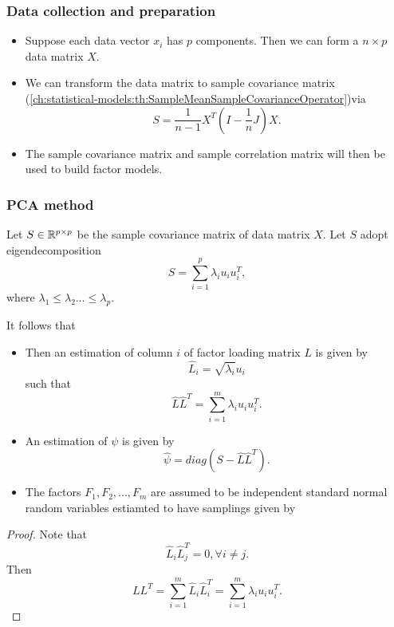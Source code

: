 \begin{refsection}
\subsubsection{Data collection and preparation}

\begin{remark}\hfill
\begin{itemize}
	\item Suppose each data vector $x_i$ has $p$ components. Then we can form a $n\times p$ data matrix $X$.
	\item We can transform the data matrix to sample covariance matrix (\autoref{ch:statistical-models:th:SampleMeanSampleCovarianceOperator})via
	$$S = \frac{1}{n-1}X^T(I-\frac{1}{n}J)X.$$
	\item The sample covariance matrix and sample correlation matrix will then be used to build factor models.
\end{itemize}	
\end{remark}


\subsubsection{PCA method}
\begin{lemma}\cite[488]{johnson2007applied}
Let $S\in \mathbb{R}^{p\times p}$ be the sample covariance matrix of data matrix $X$. Let $S$ adopt eigendecomposition $$S = \sum_{i=1}^p \lambda_i u_i u_i^T, $$where $\lambda_1\leq \lambda_2 \dots \leq \lambda_p$. 

It follows that
\begin{itemize}
	\item Then an estimation of column $i$ of factor loading matrix $L$ is given by
	$$\hat{L}_i = \sqrt{\lambda_i}u_i$$
	such that
	$$\hat{L}\hat{L}^T = \sum_{i=1}^m \lambda_i u_i u_i^T.$$
	\item An estimation of $\psi$ is given by
	$$\hat{\psi} = diag(S - \hat{L}\hat{L}^T).$$
	\item The factors $F_1,F_2,...,F_m$ are assumed to be independent standard normal random variables estiamted to have samplings given by
	$$$$ 
\end{itemize}

\end{lemma}
\begin{proof}
Note that
$$\hat{L}_i\hat{L}_j^T = 0, \forall i\neq j.$$
Then
$$LL^T = \sum_{i=1}^{m} \hat{L}_i\hat{L}_i^T = \sum_{i=1}^{m} \lambda_i u_iu_i^T.$$
\end{proof}


\end{refsection}
